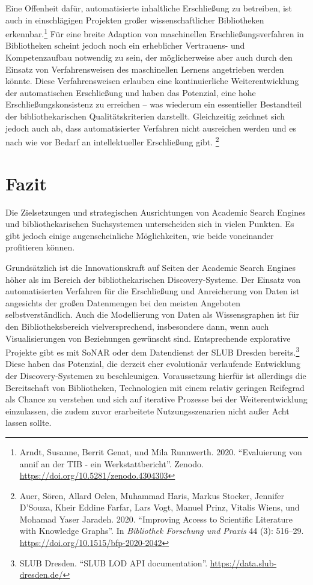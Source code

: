 \documentclass[a4paper,
fontsize=11pt,
oneside,
numbers=noperiodatend,
parskip=half-,
bibliography=totoc,
final
]{scrartcl}
\begin{document}
Eine Offenheit dafür, automatisierte inhaltliche Erschließung zu
betreiben, ist auch in einschlägigen Projekten großer wissenschaftlicher
Bibliotheken erkennbar.\footnote{Arndt, Susanne, Berrit Genat, und Mila
  Runnwerth. 2020. \enquote{Evaluierung von annif an der TIB - ein
  Werkstattbericht}. Zenodo.
  \url{https://doi.org/10.5281/zenodo.4304303}} Für eine breite Adaption
von maschinellen Erschließungsverfahren in Bibliotheken scheint jedoch
noch ein erheblicher Vertrauens- und Kompetenzaufbau notwendig zu sein,
der möglicherweise aber auch durch den Einsatz von Verfahrensweisen des
maschinellen Lernens angetrieben werden könnte. Diese Verfahrensweisen
erlauben eine kontinuierliche Weiterentwicklung der automatischen
Erschließung und haben das Potenzial, eine hohe Erschließungskonsistenz
zu erreichen -- was wiederum ein essentieller Bestandteil der
bibliothekarischen Qualitätskriterien darstellt. Gleichzeitig zeichnet
sich jedoch auch ab, dass automatisierter Verfahren nicht ausreichen
werden und es nach wie vor Bedarf an intellektueller Erschließung gibt.
\footnote{Auer, Sören, Allard Oelen, Muhammad Haris, Markus Stocker,
  Jennifer D'Souza, Kheir Eddine Farfar, Lars Vogt, Manuel Prinz,
  Vitalis Wiens, und Mohamad Yaser Jaradeh. 2020. \enquote{Improving
  Access to Scientific Literature with Knowledge Graphs}. In
  \emph{Bibliothek Forschung und Praxis} 44 (3): 516--29.
  \url{https://doi.org/10.1515/bfp-2020-2042}}

\hypertarget{fazit}{%
\section{Fazit}\label{fazit}}

Die Zielsetzungen und strategischen Ausrichtungen von Academic Search
Engines und bibliothekarischen Suchsystemen unterscheiden sich in vielen
Punkten. Es gibt jedoch einige augenscheinliche Möglichkeiten, wie beide
voneinander profitieren können.

Grundsätzlich ist die Innovationskraft auf Seiten der Academic Search
Engines höher als im Bereich der bibliothekarischen Discovery-Systeme.
Der Einsatz von automatisierten Verfahren für die Erschließung und
Anreicherung von Daten ist angesichts der großen Datenmengen bei den
meisten Angeboten selbstverständlich. Auch die Modellierung von Daten
als Wissensgraphen ist für den Bibliotheksbereich vielversprechend,
insbesondere dann, wenn auch Visualisierungen von Beziehungen gewünscht
sind. Entsprechende explorative Projekte gibt es mit SoNAR oder dem
Datendienst der SLUB Dresden bereits.\footnote{SLUB Dresden.
  \enquote{SLUB LOD API documentation}.
  \url{https://data.slub-dresden.de/}} Diese haben das Potenzial, die
derzeit eher evolutionär verlaufende Entwicklung der Discovery-Systemen
zu beschleunigen. Voraussetzung hierfür ist allerdings die Bereitschaft
von Bibliotheken, Technologien mit einem relativ geringen Reifegrad als
Chance zu verstehen und sich auf iterative Prozesse bei der
Weiterentwicklung einzulassen, die zudem zuvor erarbeitete
Nutzungsszenarien nicht außer Acht lassen sollte.
\end{document}
